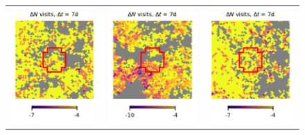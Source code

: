 \documentclass[preprintm,linenumbers]{aastex631}
\begin{document}
\begin{figure}
\begin{tabular}{  c c c}
				\includegraphics{results/skymaps_cutout/skymaps_cutout_delta_first_year_one_snap_v4_0_10yrs_db_noDD_noTwi_tscale-7_nside-256_doAllTemplateMetrics_reduceCount_g_NES_noDD_noTwi.pdf} &
				\includegraphics{results/skymaps_cutout/skymaps_cutout_delta_first_year_one_snap_v4_0_10yrs_db_noDD_noTwi_tscale-7_nside-256_doAllTemplateMetrics_reduceCount_g_WFD_noDD_noTwi.pdf} &
				\includegraphics{results/skymaps_cutout/skymaps_cutout_delta_first_year_one_snap_v4_0_10yrs_db_noDD_noTwi_tscale-7_nside-256_doAllTemplateMetrics_reduceCount_g_GP_noDD_noTwi.pdf} \\

\end{tabular}
\end{figure}
\end{document}
